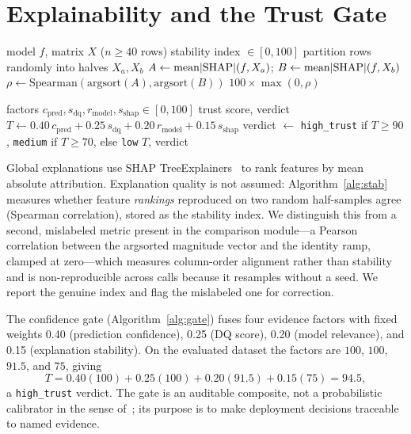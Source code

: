 \documentclass[conference]{IEEEtran}
\begin{document}
\section{Explainability and the Trust Gate}\label{sec:trust}

\begin{algorithm}[!t]
\caption{ExplanationStabilityIndex}
\label{alg:stab}
\begin{algorithmic}[1]
\REQUIRE model $f$, matrix $X$ ($n \ge 40$ rows)
\ENSURE stability index $\in [0,100]$
\STATE partition rows randomly into halves $X_a, X_b$
\STATE $A \gets \mathrm{mean}|{\rm SHAP}|(f, X_a)$; \quad $B \gets \mathrm{mean}|{\rm SHAP}|(f, X_b)$
\STATE $\rho \gets \mathrm{Spearman}(\mathrm{argsort}(A), \mathrm{argsort}(B))$
\RETURN $100 \times \max(0, \rho)$ 
\end{algorithmic}
\end{algorithm}

\begin{algorithm}[!t]
\caption{TrustGate}
\label{alg:gate}
\begin{algorithmic}[1]
\REQUIRE factors $c_{\text{pred}}, s_{\text{dq}}, r_{\text{model}}, s_{\text{shap}} \in [0,100]$
\ENSURE trust score, verdict
\STATE $T \gets 0.40\,c_{\text{pred}} + 0.25\,s_{\text{dq}} + 0.20\,r_{\text{model}} + 0.15\,s_{\text{shap}}$
\STATE verdict $\gets$ \texttt{high\_trust} if $T \ge 90$, \texttt{medium} if $T \ge 70$, else \texttt{low}
\RETURN $T$, verdict
\end{algorithmic}
\end{algorithm}

Global explanations use SHAP TreeExplainers~\cite{lundberg:2017} to rank features by mean absolute attribution. Explanation quality is not assumed: Algorithm~\ref{alg:stab} measures whether feature \emph{rankings} reproduced on two random half-samples agree (Spearman correlation), stored as the stability index. We distinguish this from a second, mislabeled metric present in the comparison module---a Pearson correlation between the argsorted magnitude vector and the identity ramp, clamped at zero---which measures column-order alignment rather than stability and is non-reproducible across calls because it resamples without a seed. We report the genuine index and flag the mislabeled one for correction.

The confidence gate (Algorithm~\ref{alg:gate}) fuses four evidence factors with fixed weights 0.40 (prediction confidence), 0.25 (DQ score), 0.20 (model relevance), and 0.15 (explanation stability). On the evaluated dataset the factors are $100$, $100$, $91.5$, and $75$, giving
\[
T = 0.40(100) + 0.25(100) + 0.20(91.5) + 0.15(75) = 94.5,
\]
a \texttt{high\_trust} verdict. The gate is an auditable composite, not a probabilistic calibrator in the sense of~\cite{guo:2017}; its purpose is to make deployment decisions traceable to named evidence.
\end{document}
